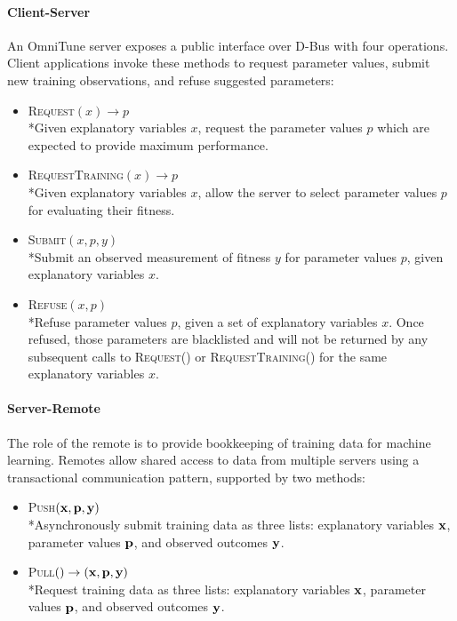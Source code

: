 \documentclass[nonatbib,preprint,nocopyrightspace,9pt]{sigplanconf}
\begin{document}
\paragraph{Client-Server} An OmniTune server exposes a public
interface over D-Bus with four operations. Client applications invoke
these methods to request parameter values, submit new training
observations, and refuse suggested parameters:
%
\begin{itemize}
\item \textsc{Request}$(x) \to p$\\*Given explanatory variables $x$,
  request the parameter values $p$ which are expected to provide
  maximum performance.
\item \textsc{RequestTraining}$(x) \to p$\\*Given explanatory
  variables $x$, allow the server to select parameter values $p$ for
  evaluating their fitness.
\item \textsc{Submit}$(x, p, y)$\\*Submit an observed measurement of
  fitness $y$ for parameter values $p$, given explanatory variables
  $x$.
\item \textsc{Refuse}$(x, p)$\\*Refuse parameter values $p$, given a
  set of explanatory variables $x$. Once refused, those parameters are
  blacklisted and will not be returned by any subsequent calls to
  \textsc{Request()} or \textsc{RequestTraining()} for the same
  explanatory variables $x$.
\end{itemize}
%

\paragraph{Server-Remote} The role of the remote is to provide
bookkeeping of training data for machine learning. Remotes allow
shared access to data from multiple servers using a transactional
communication pattern, supported by two methods:
%
\begin{itemize}
\item \textsc{Push}$(\bf{x}, \bf{p}, \bf{y})$\\*Asynchronously submit
  training data as three lists: explanatory variables $\bf{x}$,
  parameter values $\bf{p}$, and observed outcomes $\bf{y}$.
\item \textsc{Pull}$() \to (\bf{x}, \bf{p}, \bf{y})$\\*Request
  training data as three lists: explanatory variables $\bf{x}$,
  parameter values $\bf{p}$, and observed outcomes $\bf{y}$.
\end{itemize}
\end{document}
